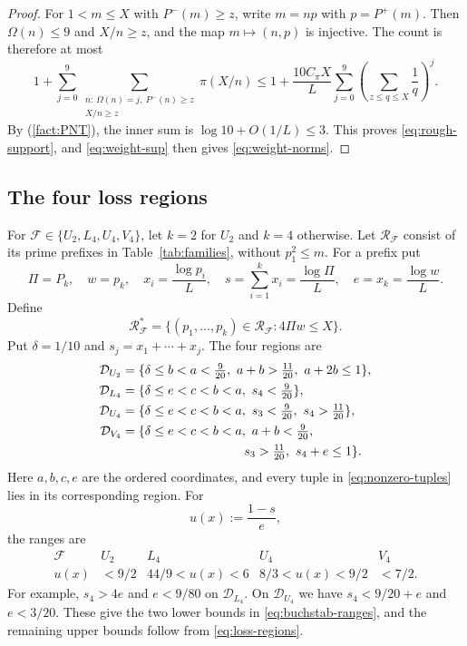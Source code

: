 \documentclass{amsart}
\newcounter{fact}
\numberwithin{equation}{section}
\numberwithin{table}{section}
\begin{document}
\begin{proof}
For $1<m\le X$ with $P^-(m)\ge z$, write $m=np$ with $p=P^+(m)$.
Then $\Omega(n)\le9$ and $X/n\ge z$, and the map $m\mapsto(n,p)$ is
injective. The count is therefore at most
\[
1+\sum_{j=0}^9
\sum_{\substack{n:\ \Omega(n)=j,\ P^-(n)\ge z\\ X/n\ge z}}
\pi(X/n)
\le1+\frac{10C_\pi X}{L}
\sum_{j=0}^9\left(\sum_{z\le q\le X}\frac1q\right)^j.
\]
By (\ref{fact:PNT}), the inner sum is $\log10+O(1/L)\le3$.
This proves \eqref{eq:rough-support}, and \eqref{eq:weight-sup} then
gives \eqref{eq:weight-norms}.
\end{proof}

\subsection{The four loss regions}

For $\mathcal F\in\{U_2,L_4,U_4,V_4\}$, let $k=2$ for $U_2$ and $k=4$
otherwise. Let $\mathcal R_{\mathcal F}$ consist of its prime prefixes in
Table~\ref{tab:families}, without $p_1^2\le m$.
For a prefix put
\[
\Pi=P_k,\quad w=p_k,\quad x_i=\frac{\log p_i}{L},\quad
s=\sum_{i=1}^k x_i=\frac{\log\Pi}{L},\quad
e=x_k=\frac{\log w}{L}.
\]
Define
\begin{equation}\label{eq:nonzero-tuples}
\mathcal R_{\mathcal F}^*
=\{(p_1,\ldots,p_k)\in\mathcal R_{\mathcal F}:4\Pi w\le X\}.
\end{equation}
Put $\delta=1/10$ and $s_j=x_1+\cdots+x_j$. The four regions are
\begin{equation}\label{eq:loss-regions}
\begin{aligned}
\mathcal D_{U_2}
&=\{\delta\le b<a<\tfrac9{20},\ a+b>\tfrac{11}{20},\ a+2b\le1\},\\
\mathcal D_{L_4}
&=\{\delta\le e<c<b<a,\ s_4<\tfrac9{20}\},\\
\mathcal D_{U_4}
&=\{\delta\le e<c<b<a,\ s_3<\tfrac9{20},\ s_4>\tfrac{11}{20}\},\\
\mathcal D_{V_4}
&=\{\delta\le e<c<b<a,\ a+b<\tfrac9{20},\\
&\hspace{34mm}s_3>\tfrac{11}{20},\ s_4+e\le1\}.
\end{aligned}
\end{equation}
Here $a,b,c,e$ are the ordered coordinates, and every tuple in
\eqref{eq:nonzero-tuples} lies in its corresponding region. For
\[
u(x):=\frac{1-s}{e},
\]
the ranges are
\begin{equation}\label{eq:buchstab-ranges}
\begin{array}{c|cccc}
\mathcal F&U_2&L_4&U_4&V_4\\ \hline
u(x)&<9/2&44/9<u(x)<6&8/3<u(x)<9/2&<7/2.
\end{array}
\end{equation}
For example, $s_4>4e$ and $e<9/80$ on $\mathcal D_{L_4}$.
On $\mathcal D_{U_4}$ we have $s_4<9/20+e$ and $e<3/20$.
These give the two lower bounds in \eqref{eq:buchstab-ranges}, and the
remaining upper bounds follow from \eqref{eq:loss-regions}.
\end{document}
